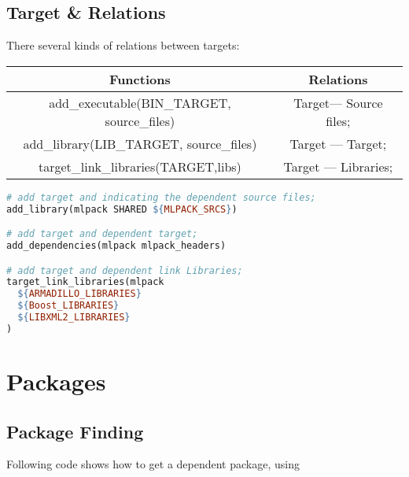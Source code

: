 \documentclass[11pt]{article}
\begin{document}
\subsection{Target \& Relations}%
\label{sub:target&relations}

There several kinds of relations between targets: 

\begin{tabular}{|c|c|}
  \hline
   \textbf{Functions} & \textbf{Relations} \\
  \hline
    add\_executable(BIN\_TARGET, source\_files) & Target--- Source files; \\
  \hline
    add\_library(LIB\_TARGET, source\_files) &  Target --- Target; \\
  \hline
    target\_link\_libraries(TARGET,libs) & Target --- Libraries; \\
  \hline
\end{tabular}


\indent

\begin{lstlisting}[language=make,label=lst:8lst,caption=Target Relations]
# add target and indicating the dependent source files;
add_library(mlpack SHARED ${MLPACK_SRCS})

# add target and dependent target;
add_dependencies(mlpack mlpack_headers)

# add target and dependent link Libraries;
target_link_libraries(mlpack
  ${ARMADILLO_LIBRARIES}
  ${Boost_LIBRARIES}
  ${LIBXML2_LIBRARIES}
)
\end{lstlisting}





\clearpage
\section{Packages}%
\label{sec:packages}

\subsection{Package Finding}%
\label{sub:package_finding}

Following code shows how to get a dependent package,
using 
\end{document}
